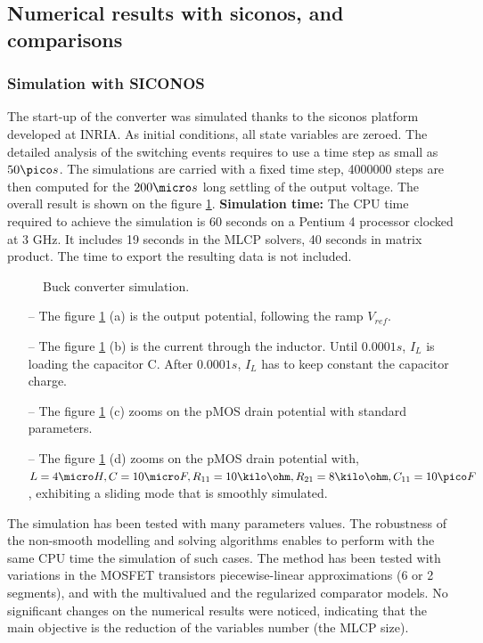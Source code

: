 \documentclass{article}
\begin{document}
\subsection{Numerical results with {\sc siconos},  and comparisons}
\label{section42}
\subsubsection{Simulation with SICONOS}
 The start-up of the converter was simulated thanks to the {\sc siconos} platform
developed at INRIA. As initial conditions, all state variables are zeroed.
The detailed analysis of the switching events requires to use a time step as
small as $50 \pico s$. The simulations are carried with a fixed time step, 4000000 steps
are then computed for the $200 \micro s$ long settling of the output voltage.
The overall result is shown on the figure \ref{fig:figSimuBuck}.  
\vskip 0.2cm
{\bf Simulation time:} The CPU time required to achieve the simulation is 60 seconds on a
Pentium 4 processor clocked at 3 GHz. It includes 19 seconds in the MLCP solvers, 40 seconds in
matrix product. The time to export the resulting data is not included.
\begin{figure}[h]
  \centering
   \scalebox{0.6}{
  
  }
  \caption{Buck converter simulation.}
  \label{fig:figSimuBuck}
\end{figure}

\begin{enumerate}
  \item[--] The figure \ref{fig:figSimuBuck} (a) is the output potential, following the ramp $V_{ref}$.
    \item[--] The figure \ref{fig:figSimuBuck} (b) is the current through the inductor. Until $0.0001s$, $I_L$
    is loading the capacitor C. After $0.0001s$, $I_L$ has to keep constant the capacitor charge.
    \item[--] The figure \ref{fig:figSimuBuck} (c) zooms on the pMOS drain potential with standard
    parameters.
    \item[--] The figure  \ref{fig:figSimuBuck} (d) zooms on the pMOS drain potential with, $L=4\micro H,
    C=10\micro F,
    R_{11}=10\kilo \ohm, R_{21}=8\kilo \ohm ,C_{11}=10\pico F$, exhibiting a
    sliding mode that is smoothly simulated. 
  \end{enumerate}

The simulation has been tested with many parameters values. The robustness of the non-smooth modelling and solving algorithms enables to perform with the same CPU time the simulation of such cases. The method has been tested with variations in the MOSFET transistors piecewise-linear approximations (6 or 2 segments), and with the multivalued and the regularized comparator models. No significant changes on the numerical results were noticed, indicating that the main objective is the reduction of the variables number (the MLCP size).  
\end{document}
